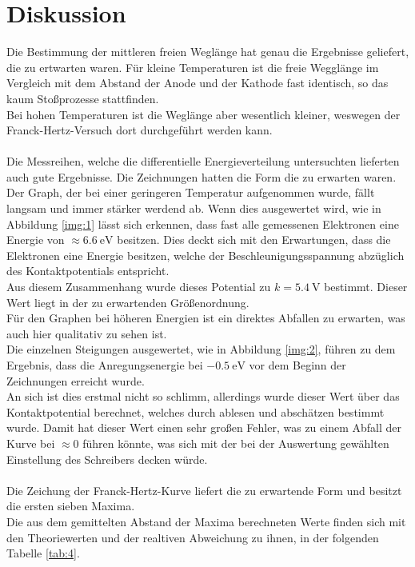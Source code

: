 \section{Diskussion}

Die Bestimmung der mittleren freien Weglänge hat genau die Ergebnisse geliefert, die zu ertwarten waren. 
Für kleine Temperaturen ist die freie Wegglänge im Vergleich mit dem Abstand der Anode und der Kathode fast identisch, so das kaum Stoßprozesse stattfinden.\\
Bei hohen Temperaturen ist die Weglänge aber wesentlich kleiner, weswegen der Franck-Hertz-Versuch dort durchgeführt werden kann.\\\\

\noindent
Die Messreihen, welche die differentielle Energieverteilung untersuchten lieferten auch gute Ergebnisse. Die Zeichnungen hatten die Form die zu erwarten waren.\\
Der Graph, der bei einer geringeren Temperatur aufgenommen wurde, fällt langsam und immer stärker werdend ab. 
Wenn dies ausgewertet wird, wie in Abbildung \ref{img:1} lässt sich erkennen, dass fast alle gemessenen Elektronen eine Energie von $\approx \SI{6.6}{\eV}$ besitzen. 
Dies deckt sich mit den Erwartungen, dass die Elektronen eine Energie besitzen, welche der Beschleunigungsspannung abzüglich des Kontaktpotentials entspricht.\\
Aus diesem Zusammenhang wurde dieses Potential zu $k=\SI{5.4}{\volt}$ bestimmt. Dieser Wert liegt in der zu erwartenden Größenordnung.\\
Für den Graphen bei höheren Energien ist ein direktes Abfallen zu erwarten, was auch hier qualitativ zu sehen ist. \\
Die einzelnen Steigungen ausgewertet, wie in Abbildung \ref{img:2}, führen zu dem Ergebnis, dass die Anregungsenergie bei $\SI{-0.5}{\eV}$ vor dem Beginn der Zeichnungen erreicht wurde.\\
An sich ist dies erstmal nicht so schlimm, allerdings wurde dieser Wert über das Kontaktpotential berechnet, welches durch ablesen und abschätzen bestimmt wurde.
Damit hat dieser Wert einen sehr großen Fehler, was zu einem Abfall der Kurve bei $\approx 0$ führen könnte, was sich mit der bei der Auswertung gewählten Einstellung des Schreibers decken würde.\\\\

\noindent
Die Zeichung der Franck-Hertz-Kurve liefert die zu erwartende Form und besitzt die ersten sieben Maxima.\\
Die aus dem gemittelten Abstand der Maxima berechneten Werte finden sich mit den Theoriewerten und der realtiven Abweichung zu ihnen, in der folgenden Tabelle \ref{tab:4}.

